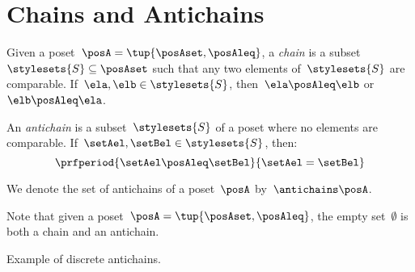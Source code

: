 
\section{Chains and Antichains}
\label{sec:chains-antichains}

\begin{definition}
    \label{def:chain}
    Given a poset~$\posA = \tup{\posAset, \posAleq}$, a \emph{chain} is a subset~$\stylesets{S} \subseteq \posAset$ such that any two elements of~$\stylesets{S}$ are comparable.
    If~$\ela, \elb \in \stylesets{S}$, then~$\ela \posAleq \elb$ or~$\elb \posAleq \ela$.
\end{definition}

\begin{definition}
    \label{def:antichain}
    An \emph{antichain} is a subset~$\stylesets{S}$ of a poset where no elements are comparable.
    If~$\setAel,\setBel \in \stylesets{S}$, then:
    \begin{equation}
        \prfperiod{\setAel \posAleq \setBel}{\setAel=\setBel}
    \end{equation}
\end{definition}

We denote the set of antichains of a poset~$\posA$ by~$\antichains\posA$.

\begin{remark}
    Note that given a poset~$\posA=\tup{\posAset,\posAleq}$, the empty set~$\emptyset$ is both a chain and an antichain.
\end{remark}

\begin{marginfigure}
    \centering
    \caption{Example of discrete antichains.}
    \label{fig:antichain}
\end{marginfigure}

